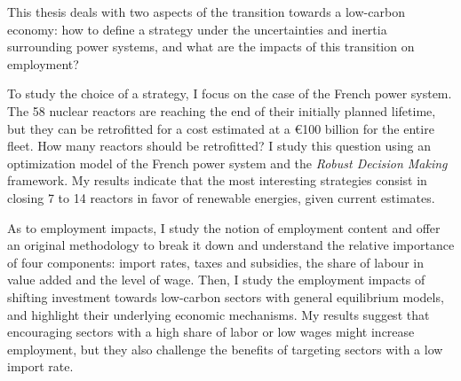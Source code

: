 
This thesis deals with two aspects of the transition towards a low-carbon economy: how to define a strategy under the uncertainties and inertia surrounding power systems, and what are the impacts of this transition on employment?

To study the choice of a strategy, I focus on the case of the French power system. The 58 nuclear reactors are reaching the end of their initially planned lifetime, but they can be retrofitted for a cost estimated at a \euro 100 billion for the entire fleet. How many reactors should be retrofitted? I study this question using an optimization model of the French power system and the \textit{Robust Decision Making} framework. My results indicate that the most interesting strategies consist in closing 7 to 14 reactors in favor of renewable energies, given current estimates.

As to employment impacts, I study the notion of employment content and offer an original methodology to break it down and understand the relative importance of four components: import rates, taxes and subsidies, the share of labour in value added and the level of wage.
Then, I study the employment impacts of shifting investment towards low-carbon sectors with general equilibrium models, and highlight their underlying economic mechanisms.
My results suggest that encouraging sectors with a high share of labor or low wages might increase employment, but they also challenge the benefits of targeting sectors with a low import rate.